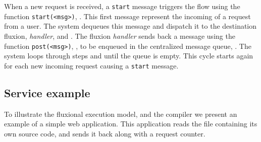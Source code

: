 When a new request is received, a \texttt{start} message triggers the flow using the function \texttt{start(<msg>)}, .
This first message represent the incoming of a request from a user.
The system dequeues this message and dispatch it to the destination fluxion, \textit{handler},  and .
The fluxion \textit{handler} sends back a message using the function \texttt{post(<msg>)}, , to be enqueued in the centralized message queue, .
The system loops through steps  and  until the queue is empty.
This cycle starts again for each new incoming request causing a \texttt{start} message.




\subsection{Service example}

To illustrate the fluxional execution model, and the compiler we present an example of a simple web application.
This application reads the file containing its own source code, and sends it back along with a request counter.

